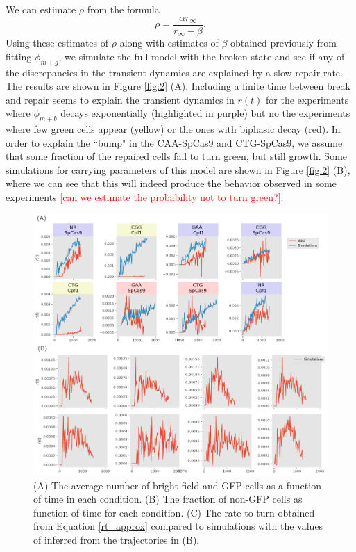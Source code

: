 \documentclass{article}
\begin{document}
We can estimate $\rho$ from the formula 
\begin{equation}
\rho = \frac{\alpha r_{\infty}}{r_{\infty} - \beta}.
\end{equation}
Using these estimates of $\rho$ along with estimates of $\beta$ obtained previously from fitting $\phi_{m+g}$, we simulate the full model with the broken state and see if any of the discrepancies in the transient dynamics are explained by a slow repair rate. The results are shown in Figure \ref{fig:2} (A). Including a finite time between break and repair seems to explain the transient dynamics in $r(t)$ for the experiments where $\phi_{m+b}$ decays exponentially (highlighted in purple) but no the experiments where few green cells appear (yellow) or the ones with biphasic decay (red). In order to explain the ``bump" in the CAA-SpCas9 and CTG-SpCas9, we assume that some fraction of the repaired cells fail to turn green, but still growth. Some simulations for carrying parameters of this model are shown in Figure \ref{fig:2} (B), where we can see that this will indeed produce the behavior observed in some experiments \textcolor{red}{[can we estimate the probability not to turn green?]}. 




\begin{figure}[h!]
\centering
\includegraphics[scale=0.6]{fig2.pdf}
\caption{(A) The average number of bright field and GFP cells as a function of time in each condition.  (B) The fraction of non-GFP cells as function of time for each condition.  (C) The rate to turn obtained from Equation \ref{rt_approx} compared to simulations with the values of inferred from the trajectories in (B). }\label{fig:1}
\end{figure}
\end{document}
